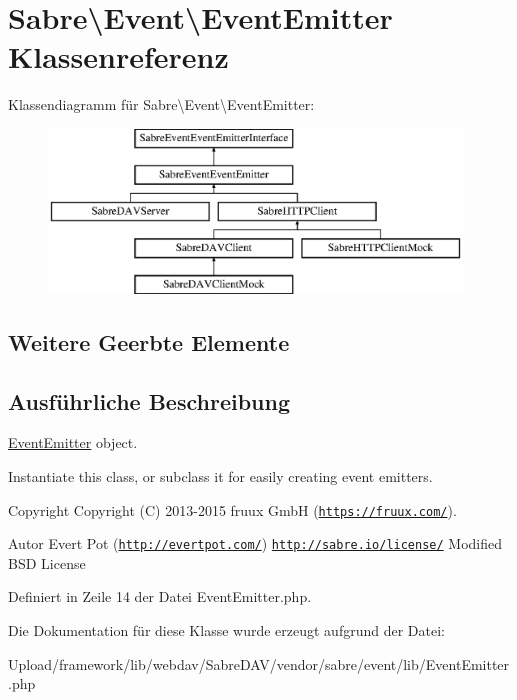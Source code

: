 \hypertarget{class_sabre_1_1_event_1_1_event_emitter}{}\section{Sabre\textbackslash{}Event\textbackslash{}Event\+Emitter Klassenreferenz}
\label{class_sabre_1_1_event_1_1_event_emitter}
Klassendiagramm für Sabre\textbackslash{}Event\textbackslash{}Event\+Emitter\+:\begin{figure}[H]
\begin{center}
\leavevmode
\includegraphics[height=4.361371cm]{class_sabre_1_1_event_1_1_event_emitter}
\end{center}
\end{figure}
\subsection*{Weitere Geerbte Elemente}


\subsection{Ausführliche Beschreibung}
\mbox{\hyperlink{class_sabre_1_1_event_1_1_event_emitter}{Event\+Emitter}} object.

Instantiate this class, or subclass it for easily creating event emitters.

\begin{DoxyCopyright}{Copyright}
Copyright (C) 2013-\/2015 fruux GmbH (\href{https://fruux.com/}{\tt https\+://fruux.\+com/}). 
\end{DoxyCopyright}
\begin{DoxyAuthor}{Autor}
Evert Pot (\href{http://evertpot.com/}{\tt http\+://evertpot.\+com/})  \href{http://sabre.io/license/}{\tt http\+://sabre.\+io/license/} Modified B\+SD License 
\end{DoxyAuthor}


Definiert in Zeile 14 der Datei Event\+Emitter.\+php.



Die Dokumentation für diese Klasse wurde erzeugt aufgrund der Datei\+:\begin{DoxyCompactItemize}
\item 
Upload/framework/lib/webdav/\+Sabre\+D\+A\+V/vendor/sabre/event/lib/Event\+Emitter.\+php\end{DoxyCompactItemize}
